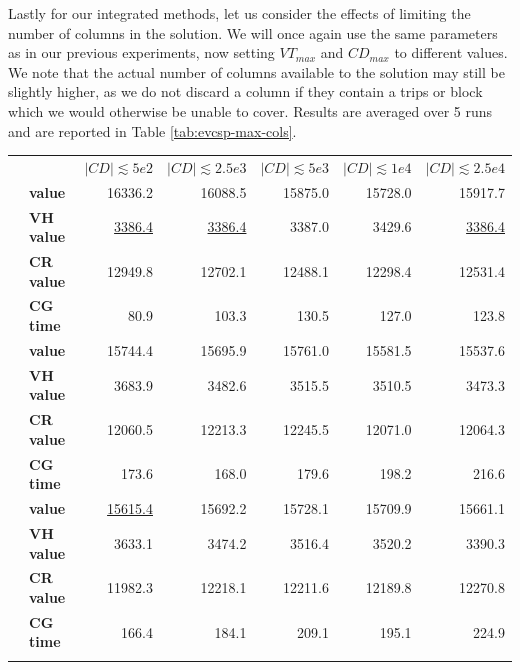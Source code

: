 \documentclass[]{article}
\begin{document}
\noindent Lastly for our integrated methods, let us consider the effects of limiting the number of columns in the solution. We will once again use the same parameters as in our previous experiments, now setting $VT_{max}$ and $CD_{max}$ to different values. We note that the actual number of columns available to the solution may still be slightly higher, as we do not discard a column if they contain a trips or block which we would otherwise be unable to cover. Results are averaged over 5 runs and are reported in Table \ref{tab:evcsp-max-cols}.

\begin{table}[h]
  \centering
  \begin{tabular}{llrrrrr}
    \toprule
    && $|CD| \lesssim 5e2$ & $|CD| \lesssim 2.5e3$ & $|CD| \lesssim 5e3$ & $|CD| \lesssim 1e4$ & $|CD| \lesssim 2.5e4$  \\
    \arrayrulecolor{black!30}\cmidrule(lr){1-7}
    \addlinespace[0.4em]
    \multirow{4}{*}{$|VT| \lesssim 5e2$} & \textbf{value}  & 16336.2 & 16088.5 & 15875.0 & 15728.0 & 15917.7 \\
    & \textbf{VH value} & \underline{3386.4} & \underline{3386.4} & 3387.0 & 3429.6 & \underline{3386.4} \\
    & \textbf{CR value} & 12949.8 & 12702.1 & 12488.1 & 12298.4 & 12531.4 \\
    & \textbf{CG time} & 80.9 & 103.3 & 130.5 & 127.0 & 123.8 \\
    \arrayrulecolor{black!30}\cmidrule(lr){1-7}
    \multirow{4}{*}{$|VT| \lesssim 2.5e3$} & \textbf{value}  & 15744.4 & 15695.9 & 15761.0& 15581.5& 15537.6\\
    & \textbf{VH value} & 3683.9 & 3482.6 & 3515.5 & 3510.5 & 3473.3 \\
    & \textbf{CR value} & 12060.5 & 12213.3 & 12245.5 & 12071.0 & 12064.3 \\
    & \textbf{CG time} & 173.6 & 168.0 & 179.6 & 198.2 & 216.6 \\
    \arrayrulecolor{black!30}\cmidrule(lr){1-7}
    \multirow{4}{*}{$|VT| \lesssim 5e3$} & \textbf{value}  & \underline{15615.4} & 15692.2 & 15728.1& 15709.9& 15661.1\\
    & \textbf{VH value} & 3633.1 & 3474.2 & 3516.4 & 3520.2 & 3390.3 \\
    & \textbf{CR value} & 11982.3 & 12218.1 & 12211.6 & 12189.8 & 12270.8 \\
    & \textbf{CG time} & 166.4 & 184.1 & 209.1 & 195.1 & 224.9 \\
    \arrayrulecolor{black!30}\cmidrule(lr){1-7}

\end{tabular}
\end{table}
\end{document}
